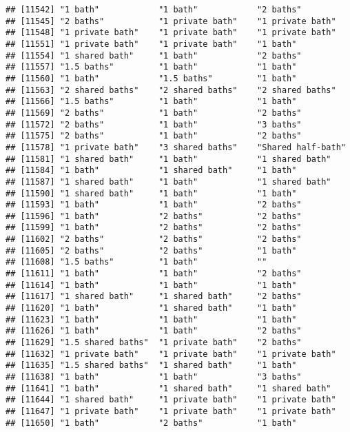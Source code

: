 \documentclass[
]{article}
\begin{document}
\begin{verbatim}
## [11542] "1 bath"            "1 bath"            "2 baths"          
## [11545] "2 baths"           "1 private bath"    "1 private bath"   
## [11548] "1 private bath"    "1 private bath"    "1 private bath"   
## [11551] "1 private bath"    "1 private bath"    "1 bath"           
## [11554] "1 shared bath"     "1 bath"            "2 baths"          
## [11557] "1.5 baths"         "1 bath"            "1 bath"           
## [11560] "1 bath"            "1.5 baths"         "1 bath"           
## [11563] "2 shared baths"    "2 shared baths"    "2 shared baths"   
## [11566] "1.5 baths"         "1 bath"            "1 bath"           
## [11569] "2 baths"           "1 bath"            "2 baths"          
## [11572] "2 baths"           "1 bath"            "3 baths"          
## [11575] "2 baths"           "1 bath"            "2 baths"          
## [11578] "1 private bath"    "3 shared baths"    "Shared half-bath" 
## [11581] "1 shared bath"     "1 bath"            "1 shared bath"    
## [11584] "1 bath"            "1 shared bath"     "1 bath"           
## [11587] "1 shared bath"     "1 bath"            "1 shared bath"    
## [11590] "1 shared bath"     "1 bath"            "1 bath"           
## [11593] "1 bath"            "1 bath"            "2 baths"          
## [11596] "1 bath"            "2 baths"           "2 baths"          
## [11599] "1 bath"            "2 baths"           "2 baths"          
## [11602] "2 baths"           "2 baths"           "2 baths"          
## [11605] "2 baths"           "2 baths"           "1 bath"           
## [11608] "1.5 baths"         "1 bath"            ""                 
## [11611] "1 bath"            "1 bath"            "2 baths"          
## [11614] "1 bath"            "1 bath"            "1 bath"           
## [11617] "1 shared bath"     "1 shared bath"     "2 baths"          
## [11620] "1 bath"            "1 shared bath"     "1 bath"           
## [11623] "1 bath"            "1 bath"            "1 bath"           
## [11626] "1 bath"            "1 bath"            "2 baths"          
## [11629] "1.5 shared baths"  "1 private bath"    "2 baths"          
## [11632] "1 private bath"    "1 private bath"    "1 private bath"   
## [11635] "1.5 shared baths"  "1 shared bath"     "1 bath"           
## [11638] "1 bath"            "1 bath"            "3 baths"          
## [11641] "1 bath"            "1 shared bath"     "1 shared bath"    
## [11644] "1 shared bath"     "1 private bath"    "1 private bath"   
## [11647] "1 private bath"    "1 private bath"    "1 private bath"   
## [11650] "1 bath"            "2 baths"           "1 bath"           

\end{verbatim}
\end{document}
